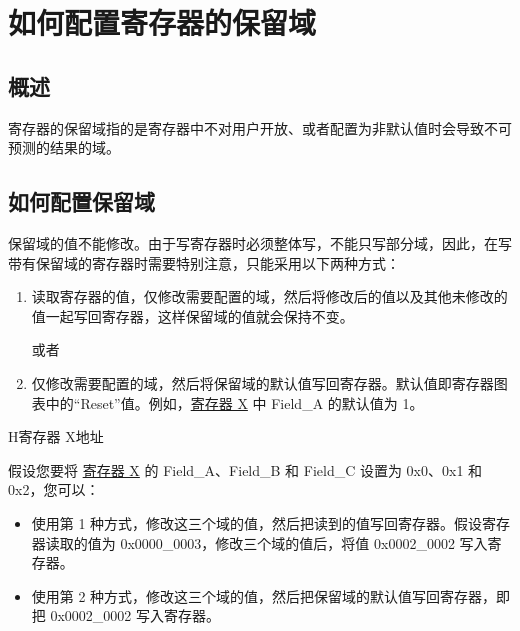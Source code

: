 \chapter*{如何配置寄存器的保留域}\label{programming-reserved-field}

\section*{概述}

寄存器的保留域指的是寄存器中不对用户开放、或者配置为非默认值时会导致不可预测的结果的域。

\section*{如何配置保留域}

保留域的值不能修改。由于写寄存器时必须整体写，不能只写部分域，因此，在写带有保留域的寄存器时需要特别注意，只能采用以下两种方式：

\begin{enumerate}
\item 读取寄存器的值，仅修改需要配置的域，然后将修改后的值以及其他未修改的值一起写回寄存器，这样保留域的值就会保持不变。

\noindent 或者

\item 仅修改需要配置的域，然后将保留域的默认值写回寄存器。默认值即寄存器图表中的“Reset”值。例如，\hyperref[fig:registerX]{寄存器 X} 中 Field\_A 的默认值为 1。
\end{enumerate}

\begin{register}{H}{寄存器 X}{地址}\label{fig:registerX}
%
%
%
%
%
\regnewline%

\end{register}

假设您要将 \hyperref[fig:registerX]{寄存器 X} 的 Field\_A、Field\_B 和 Field\_C 设置为 0x0、0x1 和 0x2，您可以：

\begin{itemize}
\item 使用第 1 种方式，修改这三个域的值，然后把读到的值写回寄存器。假设寄存器读取的值为 0x0000\_0003，修改三个域的值后，将值 0x0002\_0002 写入寄存器。
\item 使用第 2 种方式，修改这三个域的值，然后把保留域的默认值写回寄存器，即把 0x0002\_0002 写入寄存器。
\end{itemize}
